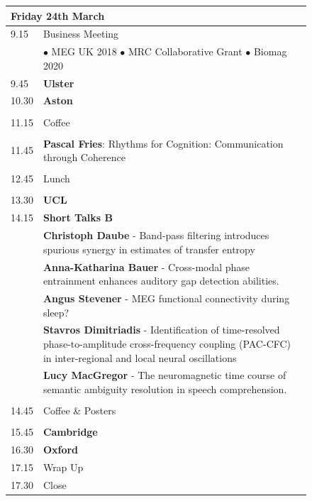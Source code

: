 \documentclass[12pt,a4paper]{article}
\begin{document}
\begin{figure}[h]
\centering
\begin{tabularx}{.95\textwidth}{lp{.8\linewidth}}
\multicolumn{2}{l}{\Large Friday 24th March}\\
\toprule
9.15 & Business Meeting\\
& {\small $\bullet$ MEG UK 2018}  {\small $\bullet$ MRC Collaborative Grant} {\small $\bullet$ Biomag 2020}\\
9.45 & {\bf Ulster}\\
10.30 & {\bf Aston}\\
\\
11.15 & Coffee\\
\\
11.45 & {\bf Pascal Fries}: {\small Rhythms for Cognition: Communication through Coherence}\\
\\
12.45 & Lunch  \\
\\
13.30 & {\bf UCL} \\
14.15 & {\bf Short Talks B}\vspace{.25cm}\\
& \hspace{.5cm} \parbox{.75\textwidth}{\raggedright\small {\bf Christoph Daube} - Band-pass filtering introduces spurious synergy in estimates of transfer entropy}\vspace{.25cm}\\
& \hspace{.5cm} \parbox{.75\textwidth}{\raggedright\small {\bf Anna-Katharina Bauer} - Cross-modal phase entrainment enhances auditory gap detection abilities.}\vspace{.25cm}\\
& \hspace{.5cm} \parbox{.75\textwidth}{\raggedright\small {\bf Angus Stevener} - MEG functional connectivity during sleep?}\vspace{.25cm}\\
& \hspace{.5cm} \parbox{.75\textwidth}{\raggedright\small {\bf Stavros Dimitriadis} - Identification of time-resolved phase-to-amplitude cross-frequency coupling (PAC-CFC) in inter-regional and local neural oscillations}\vspace{.25cm}\\
& \hspace{.5cm} \parbox{.75\textwidth}{\raggedright\small {\bf Lucy MacGregor} - The neuromagnetic time course of semantic ambiguity resolution in speech comprehension.}\vspace{.25cm}
\\
\\
14.45 & Coffee \& Posters \\
\\
15.45 & {\bf Cambridge} \\
16.30 & {\bf Oxford} \\
17.15 & Wrap Up \\
17.30 & Close\\
\bottomrule
\end{tabularx}
\end{figure}
\end{document}
